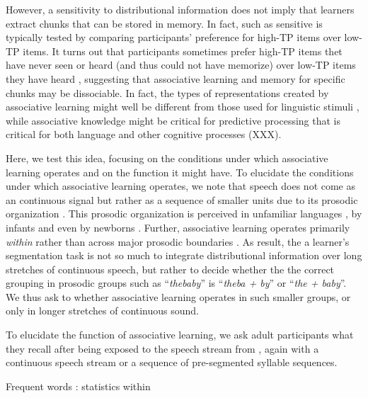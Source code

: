 \documentclass[]{article}
\begin{document}
However, a sensitivity to distributional information does not imply that
learners extract chunks that can be stored in memory. In fact, such as
sensitive is typically tested by comparing participants' preference for
high-TP items over low-TP items. It turns out that participants
sometimes prefer high-TP items thet have never seen or heard (and thus
could not have memorize) over low-TP items they have heard
\citep{Endress-Phantoms-Vision}, suggesting that associative learning
and memory for specific chunks may be dissociable. In fact, the types of
representations created by associative learning might well be different
from those used for linguistic stimuli
\citep{Endress-Phantoms-Vision, Fischer-Baum2011}, while associative
knowledge might be critical for predictive processing that is critical
for both language \citep{Levy2008, Trueswell1999} and other cognitive
processes (XXX).

Here, we test this idea, focusing on the conditions under which
associative learning operates and on the function it might have. To
elucidate the conditions under which associative learning operates, we
note that speech does not come as an continuous signal but rather as a
sequence of smaller units due to its prosodic organization
\citep{Beckman1986, Cutler1997, Nespor1986, Selkirk1986, Shattuck-Hufnagel1996}.
This prosodic organization is perceived in unfamiliar languages
\citep{Brentari2011, Endress-cross-seg, Fenlon2008, Pilon1981}, by
infants
\citetext{\citealp{Hirsh-Pasek1987}; \citealp[Christophe1994;][]{Gout2004}}
and even by newborns \citep{Christophe2001}. Further, associative
learning operates primarily \emph{within} rather than across major
prosodic boundaries \citep{Shukla2007, Shukla2011}. As result, the a
learner's segmentation task is not so much to integrate distributional
information over long stretches of continuous speech, but rather to
decide whether the the correct grouping in prosodic groups such as
``\emph{thebaby}'' is ``\emph{theba + by}'' or ``\emph{the + baby}''. We
thus ask to whether associative learning operates in such smaller
groups, or only in longer stretches of continuous sound.

To elucidate the function of associative learning, we ask adult
participants what they recall after being exposed to the speech stream
from \citep{Saffran-Science}, again with a continuous speech stream or a
sequence of pre-segmented syllable sequences.

\citep{Bortfeld2005, Shi2008} Frequent words \citep{Ngon2013}:
statistics within
\end{document}
